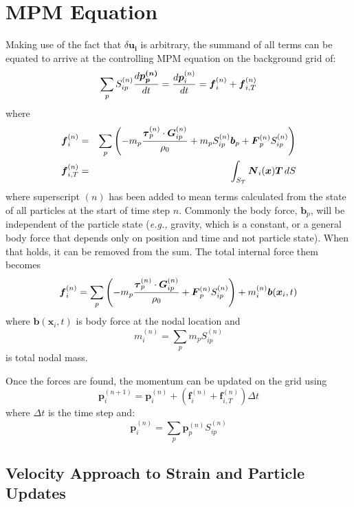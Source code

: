 \documentclass[11pt]{article}
\renewcommand{\vec}[1]{\boldsymbol{#1}}
\newcommand{\tens}[1]{\boldsymbol{\mathsf{#1}}}
\begin{document}
\section{MPM Equation}

Making use of the fact that $\delta\vec{u_i}$ is arbitrary, the summand of all terms can be equated to arrive at the controlling MPM equation on the background grid of:
\begin{equation}
    \sum_p S_{ip}^{(n)} {d\vec{ p_p^{(n)}}\over dt} = {d\vec p_i^{(n)}\over dt} = \vec f_i^{(n)} + \vec f_{i,T} ^{(n)}            \label{momEq}
\end{equation}
where
\begin{eqnarray}
	 \vec f_i^{(n)} & = & \sum_p \left(-m_p{\tens\tau_p^{(n)}\cdot \vec G_{ip}^{(n)}\over \rho_0}  + m_p S_{ip}^{(n)}  \vec b_p +  \vec F_p^{(n)}S_{ip}^{(n)}\right) \\
	 \vec f_{i,T}^{(n)} & = & \int_{S_T}\vec N_i(\vec x) \vec T \thinspace dS
\end{eqnarray}
where superscript $(n)$ has been added to mean terms calculated from the state of all particles at the start of time step $n$. Commonly the body force, $\vec b_p$, will be independent of the particle state ({\em e.g.,} gravity, which is a constant, or a general body force that depends only on position and time and not particle state). When that holds, it can be removed from the sum. The total internal force them becomes
\begin{equation}
	 \vec f_i^{(n)} = \sum_p \left(-m_p{\tens\tau_p^{(n)}\cdot \vec G_{ip}^{(n)}\over \rho_0}  +  \vec F_p^{(n)}S_{ip}^{(n)}\right)  + m_i^{(n)}\vec b(\vec x_i,t) 
	 \label{fidef}
\end{equation}
where $\vec b(\vec x_i,t)$ is body force at the nodal location and
\begin{equation}
	 m_i^{(n)} = \sum_p m_p S_{ip}^{(n)} 
\end{equation}
is total nodal mass.

Once the forces are found, the momentum can be updated on the grid using
\begin{equation}
           \vec p_i^{(n+1)} = \vec p_i^{(n)} + (\vec f_i^{(n)} + \vec f_{i,T}^{(n)})\Delta t
\end{equation}
where $\Delta t$ is the time step and:
\begin{equation}
         	 \vec{p}_i^{(n)} = \sum_p \vec{p}_p^{(n)} S_{ip}^{(n)} 
\end{equation}

\subsection{Velocity Approach to Strain and Particle Updates}
\end{document}
